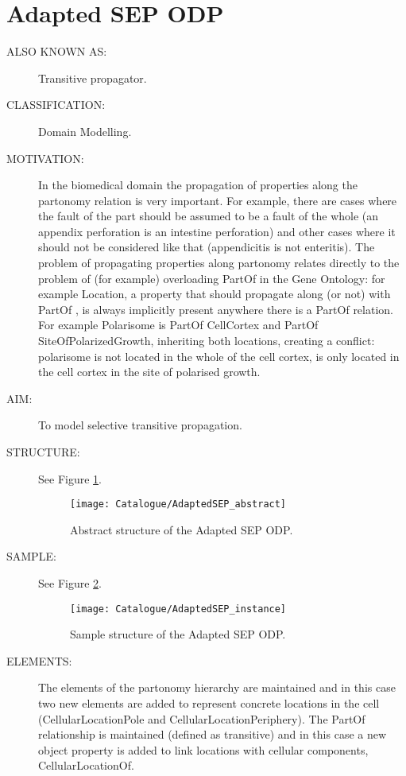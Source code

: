  \section{Adapted SEP ODP}\begin{description}
\item [ALSO KNOWN AS:] Transitive propagator.

\item [CLASSIFICATION:] Domain Modelling.

\item [MOTIVATION:] In the biomedical domain the propagation of properties along the partonomy relation is very important. For example, there are cases where the fault of the part should be assumed to be a fault of the whole (an appendix perforation is an intestine perforation) and other cases where it should not be considered like that (appendicitis is not enteritis). The problem of propagating properties along partonomy relates directly to the problem of (for example) overloading PartOf in the Gene Ontology: for example Location, a property that should propagate along (or not) with PartOf , is always implicitly present anywhere there is a PartOf relation. For example Polarisome is PartOf  CellCortex and PartOf SiteOfPolarizedGrowth, inheriting both locations, creating a conflict: polarisome is not located in the whole of the cell cortex, is only located in the cell cortex in the site of polarised growth.

\item [AIM:] To model selective transitive propagation.

\item [STRUCTURE:] See Figure \ref{odp:AdaptedSEP_abstract}.
\begin{figure}[]\centering\texttt{[image: Catalogue/AdaptedSEP\_abstract]}\caption{\label{odp:AdaptedSEP_abstract} Abstract structure of the Adapted SEP ODP.}\end{figure}

\item [SAMPLE:] See Figure \ref{odp:AdaptedSEP_instance}.
\begin{figure}[]\centering\texttt{[image: Catalogue/AdaptedSEP\_instance]}\caption{\label{odp:AdaptedSEP_instance} Sample structure of the Adapted SEP ODP.}\end{figure}

\item [ELEMENTS:] The elements of the partonomy hierarchy are maintained and in this case two new elements are added to represent concrete locations in the cell (CellularLocationPole and CellularLocationPeriphery). The PartOf relationship is maintained (defined as transitive) and in this case a new object property is added to link locations with cellular components, CellularLocationOf.


\end{description}
